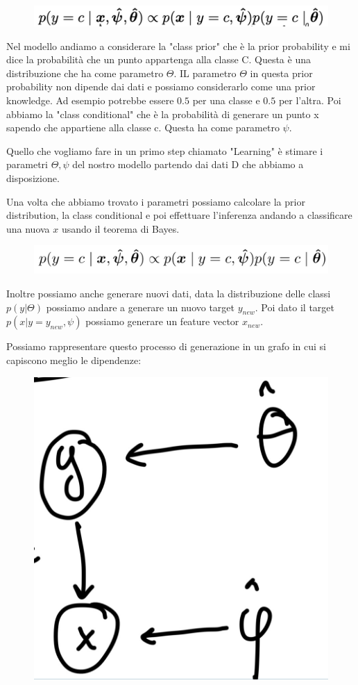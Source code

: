 \documentclass[14pt]{extreport}
\begin{document}
\begin{figure}[H]
\centering
\includegraphics[width=0.7\linewidth]{201.jpeg}
\end{figure}

Nel modello andiamo a considerare la "class prior" che è la prior probability e mi dice la probabilità che un punto appartenga alla classe C. Questa è
una distribuzione che ha come parametro $\Theta$. IL parametro $\Theta$ in questa prior probability non dipende dai dati e possiamo considerarlo come
una prior knowledge. Ad esempio potrebbe essere $0.5$ per una classe e $0.5$ per l'altra. Poi abbiamo la "class conditional" che è la probabilità di
generare un punto x sapendo che appartiene alla classe c. Questa ha come parametro $\psi$.

Quello che vogliamo fare in un primo step chiamato "Learning" è stimare i parametri ${\Theta, \psi}$ del nostro modello partendo dai dati D che
abbiamo a disposizione.

Una volta che abbiamo trovato i parametri possiamo calcolare la prior distribution, la class conditional e poi effettuare l'inferenza andando a
classificare una nuova $x$ usando il teorema di Bayes.
\begin{figure}[H]
\centering
\includegraphics[width=0.7\linewidth]{159.jpeg}
\end{figure}

Inoltre possiamo anche generare nuovi dati, data la distribuzione delle classi $p(y|\Theta)$ possiamo andare a generare un nuovo target $y_{new}$. Poi
dato il target $p(x|y=y_{new}, \psi)$ possiamo generare un feature vector $x_{new}$.

Possiamo rappresentare questo processo di generazione in un grafo in cui si capiscono meglio le dipendenze:

\begin{figure}[H]
\centering
\includegraphics[width=0.2\linewidth]{160.jpeg}
\end{figure}
\end{document}
